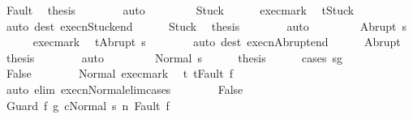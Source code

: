 \begin{isabellebody}
\ Fault\ \isamarkupfalse%
\ {\isacharquery}thesis\isanewline
\ \ \ \ \ \ \isamarkupfalse%
\ auto\isanewline
\ \ \isamarkupfalse%
\isanewline
\ \ \ \ \isamarkupfalse%
\ Stuck\isanewline
\ \ \ \ \isamarkupfalse%
\ exec{\isacharunderscore}mark\ \isamarkupfalse%
\ {\isachardoublequoteopen}t{\isacharequal}Stuck{\isachardoublequoteclose}\isanewline
\ \ \ \ \ \ \isamarkupfalse%
\ {\isacharparenleft}auto\ dest{\isacharcolon}\ execn{\isacharunderscore}Stuck{\isacharunderscore}end{\isacharparenright}\isanewline
\ \ \ \ \isamarkupfalse%
\ Stuck\ \isamarkupfalse%
\ {\isacharquery}thesis\isanewline
\ \ \ \ \ \ \isamarkupfalse%
\ auto\isanewline
\ \ \isamarkupfalse%
\isanewline
\ \ \ \ \isamarkupfalse%
\ {\isacharparenleft}Abrupt\ s{\isacharprime}{\isacharparenright}\isanewline
\ \ \ \ \isamarkupfalse%
\ exec{\isacharunderscore}mark\ \isamarkupfalse%
\ {\isachardoublequoteopen}t{\isacharequal}Abrupt\ s{\isacharprime}{\isachardoublequoteclose}\isanewline
\ \ \ \ \ \ \isamarkupfalse%
\ {\isacharparenleft}auto\ dest{\isacharcolon}\ execn{\isacharunderscore}Abrupt{\isacharunderscore}end{\isacharparenright}\isanewline
\ \ \ \ \isamarkupfalse%
\ Abrupt\ \isamarkupfalse%
\ {\isacharquery}thesis\isanewline
\ \ \ \ \ \ \isamarkupfalse%
\ auto\isanewline
\ \ \isamarkupfalse%
\isanewline
\ \ \ \ \isamarkupfalse%
\ {\isacharparenleft}Normal\ s{\isacharprime}{\isacharparenright}\isanewline
\ \ \ \ \isamarkupfalse%
\ {\isacharquery}thesis\isanewline
\ \ \ \ \isamarkupfalse%
\ {\isacharparenleft}cases\ {\isachardoublequoteopen}s{\isacharprime}{\isasymin}g{\isachardoublequoteclose}{\isacharparenright}\isanewline
\ \ \ \ \ \ \isamarkupfalse%
\ False\isanewline
\ \ \ \ \ \ \isamarkupfalse%
\ Normal\ exec{\isacharunderscore}mark\ \isamarkupfalse%
\ t{\isacharcolon}\ {\isachardoublequoteopen}t{\isacharequal}Fault\ f{\isachardoublequoteclose}\isanewline
\ \ \ \ \ \ \ \ \isamarkupfalse%
\ {\isacharparenleft}auto\ elim{\isacharcolon}\ execn{\isacharunderscore}Normal{\isacharunderscore}elim{\isacharunderscore}cases{\isacharparenright}\isanewline
\ \ \ \ \ \ \isamarkupfalse%
\ False\isanewline
\ \ \ \ \ \ \isamarkupfalse%
\ {\isachardoublequoteopen}{\isasymGamma}{\isasymturnstile}{\isasymlangle}Guard\ f{\isacharprime}\ g\ c{\isacharcomma}Normal\ s{\isacharprime}{\isasymrangle}\ {\isacharequal}n{\isasymRightarrow}\ Fault\ f{\isacharprime}{\isachardoublequoteclose}\isanewline

\end{isabellebody}
